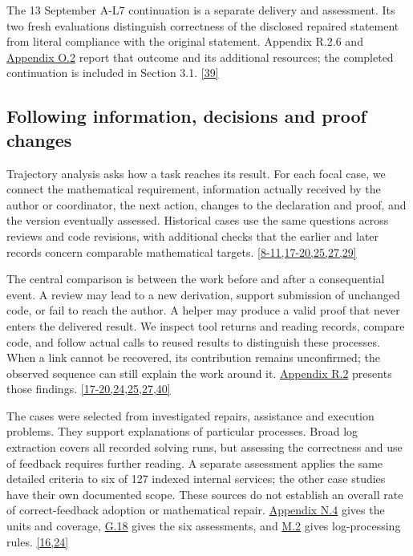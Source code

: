 The 13 September A-L7 continuation is a separate delivery and assessment. Its two fresh evaluations distinguish correctness of the disclosed repaired statement from literal compliance with the original statement. Appendix R.2.6 and \href{en-appendix.pdf\#o2}{Appendix O.2} report that outcome and its additional resources; the completed continuation is included in Section 3.1. \hyperlink{ref-39}{\mbox{[39]}}

\subsection[Following information, decisions and proof changes]{\texorpdfstring{\protect\hypertarget{section-2-5}{}Following information, decisions and proof changes}{Following information, decisions and proof changes}}
Trajectory analysis asks how a task reaches its result. For each focal case, we connect the mathematical requirement, information actually received by the author or coordinator, the next action, changes to the declaration and proof, and the version eventually assessed. Historical cases use the same questions across reviews and code revisions, with additional checks that the earlier and later records concern comparable mathematical targets. \hyperlink{ref-8}{\mbox{[8-11,17-20,25,27,29]}}

The central comparison is between the work before and after a consequential event. A review may lead to a new derivation, support submission of unchanged code, or fail to reach the author. A helper may produce a valid proof that never enters the delivered result. We inspect tool returns and reading records, compare code, and follow actual calls to reused results to distinguish these processes. When a link cannot be recovered, its contribution remains unconfirmed; the observed sequence can still explain the work around it. \href{en-appendix.pdf\#r2}{Appendix R.2} presents those findings. \hyperlink{ref-17}{\mbox{[17-20,24,25,27,40]}}

The cases were selected from investigated repairs, assistance and execution problems. They support explanations of particular processes. Broad log extraction covers all recorded solving runs, but assessing the correctness and use of feedback requires further reading. A separate assessment applies the same detailed criteria to six of 127 indexed internal services; the other case studies have their own documented scope. These sources do not establish an overall rate of correct-feedback adoption or mathematical repair. \href{en-appendix.pdf\#n4}{Appendix N.4} gives the units and coverage, \href{en-appendix.pdf\#g18}{G.18} gives the six assessments, and \href{en-appendix.pdf\#m2}{M.2} gives log-processing rules. \hyperlink{ref-16}{\mbox{[16,24]}}

